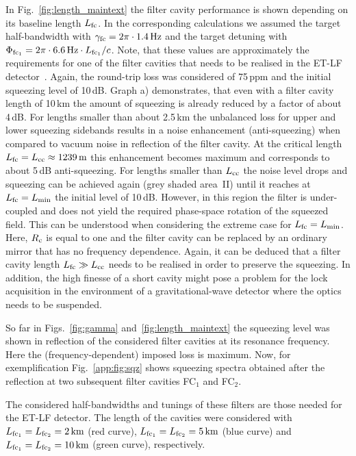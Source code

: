 In Fig.~\ref{fig:length_maintext} the filter cavity performance is shown
depending on its baseline length $L_{\rm fc}$. In the
corresponding calculations we assumed the target half-bandwidth
with ${\gamma_{\rm fc} = 2\pi\cdot1.4\,{\rm Hz}}$ and the target detuning with
${\Phi_{\rm fc_1}= 2\pi\cdot 6.6\,{\rm Hz}\cdot L_{\rm fc_1}/c}$.
Note, that these values are approximately the requirements for one of the filter
cavities that needs to be realised in the ET-LF
detector~\cite{Hild2010a}. Again, the round-trip loss was
considered of 75\,ppm and the initial squeezing level of 10\,dB.  Graph a)
demonstrates, that even with a filter cavity length of 10\,km the
amount of squeezing  is already reduced by a factor of about
4\,dB. For lengths smaller than about 2.5\,km the unbalanced loss for upper and lower squeezing sidebands results in a noise enhancement (anti-squeezing) when compared to vacuum noise in reflection of the filter cavity.  At the critical length $L_{\rm fc} = L_{\rm
cc}\approx1239\,\rm m$ this enhancement becomes maximum and corresponds to about 5\,dB anti-squeezing. For lengths smaller than $L_{\rm cc}$  the noise level drops and squeezing can be achieved again (grey shaded area~II) until it reaches at $L_{\rm fc} =
L_{\min}$ the initial level of 10\,dB. However, in this region the
filter is under-coupled and does not yield the required
phase-space rotation of the squeezed field. This can be understood
when considering the extreme case for $L_{\rm fc} = L_{\min}$.
Here, $R_{\rm c}$ is equal to one and  the filter cavity can be
replaced by  an ordinary mirror that has no frequency dependence.
Again, it can be deduced that a filter cavity length  $L_{\rm fc}
\gg L_{\rm cc}$ needs to be realised in order to preserve the
squeezing. In addition, the high finesse of a short cavity might
pose a problem for the lock acquisition in the environment of a gravitational-wave detector where the optics
needs to be suspended.

So far in Figs.~\ref{fig:gamma} and~\ref{fig:length_maintext} the squeezing level was shown in reflection of the considered filter cavities at its resonance frequency. Here the  (frequency-dependent) imposed loss is maximum. Now, for  exemplification
Fig.~\ref{app:fig:sqz} shows squeezing spectra obtained after the
reflection at two subsequent filter cavities FC$_1$ and FC$_2$.

The considered  half-bandwidths and tunings of these filters are
those needed for the ET-LF detector. The length of the cavities
were considered with  $L_{\rm fc_1}=L_{\rm fc_2}=2\,{\rm km}$ (red
curve), $L_{\rm fc_1}=L_{\rm fc_2}=5\,{\rm km}$ (blue curve) and
$L_{\rm fc_1}=L_{\rm fc_2}=10\,{\rm km}$ (green curve),
respectively.


